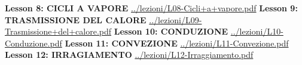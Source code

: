 \newline
\newline
\textbf{Lesson 8: CICLI A VAPORE}\newline
\url{../lezioni/L08-Cicli+a+vapore.pdf}
\newline
\newline
\textbf{Lesson 9: TRASMISSIONE DEL CALORE}\newline
\url{../lezioni/L09-Trasmissione+del+calore.pdf}
\newline
\newline
\textbf{Lesson 10: CONDUZIONE}\newline
\url{../lezioni/L10-Conduzione.pdf}
\newline
\newline
\textbf{Lesson 11: CONVEZIONE}\newline
\url{../lezioni/L11-Convezione.pdf}
\newline
\newline
\textbf{Lesson 12: IRRAGIAMENTO}\newline
\url{../lezioni/L12-Irraggiamento.pdf}